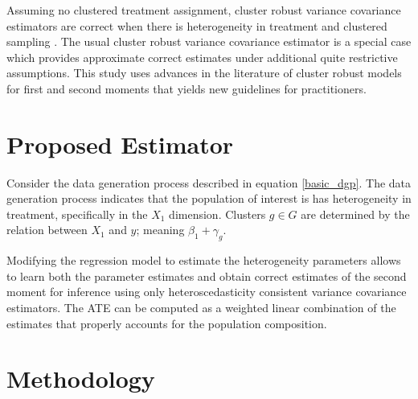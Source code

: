 \documentclass{jbsc}
\begin{document}
Assuming no clustered treatment assignment, cluster robust variance covariance estimators are correct when there is heterogeneity in treatment and clustered sampling \citep{Abadie_Athey_Imbens_Wooldridge_2017}. The usual cluster robust variance covariance estimator is a special case which provides approximate correct estimates under additional quite restrictive assumptions. This study uses advances in the literature of cluster robust models for first and second moments that yields new guidelines for practitioners.

\section{Proposed Estimator}

Consider the data generation process described in equation \ref{basic_dgp}. The data generation process indicates that the population of interest is has heterogeneity in treatment, specifically in the $X_{1}$ dimension. Clusters $g \in G$ are determined by the relation between $X_{1}$ and $y$; meaning $\beta_{1} + \gamma_{g}$.

Modifying the regression model to estimate the heterogeneity parameters allows to learn both the parameter estimates and obtain correct estimates of the second moment for inference using only heteroscedasticity consistent variance covariance estimators. The ATE can be computed as a weighted linear combination of the estimates that properly accounts for the population composition.

\section{Methodology}
\end{document}

